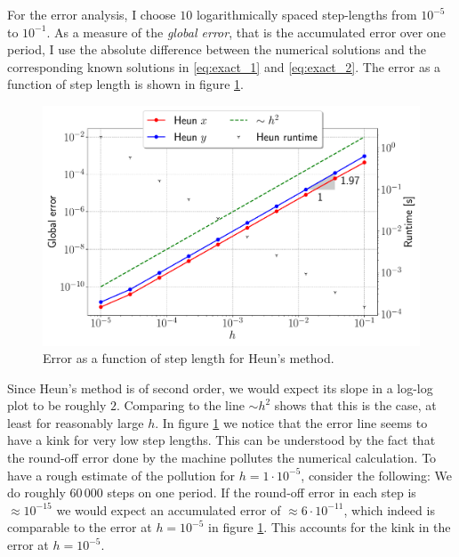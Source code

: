 For the error analysis, I choose $10$ logarithmically spaced step-lengths from $10^{-5}$ to $10^{-1}$. As a measure of the \textit{global error}, that is the accumulated error over one period, I use the absolute difference between the numerical solutions and the corresponding known solutions in \eqref{eq:exact_1} and \eqref{eq:exact_2}. The error as a function of step length is shown in figure \ref{fig:err_heun}.
\begin{figure}[htb]
		\centering
		\includegraphics[width =0.8\columnwidth]{../fig/err_heun.pdf}
		\caption{Error as a function of step length for Heun's method.}
		\label{fig:err_heun}
\end{figure}
Since Heun's method is of second order, we would expect its slope in a log-log plot to be roughly $2$. Comparing to the line $\sim h^2$ shows that this is the case, at least for reasonably large $h$. In figure \ref{fig:err_heun} we notice that the error line seems to have a kink for very low step lengths. This can be understood by the fact that the round-off error done by the machine pollutes the numerical calculation. To have a rough estimate of the pollution for $h = 1\cdot 10^{-5}$, consider the following: We do roughly $60\,000$ steps on one period. If the round-off error in each step is $\approx 10^{-15}$ we would expect an accumulated error of $\approx 6\cdot 10^{-11}$, which indeed is comparable to the error at $h = 10^{-5}$ in figure \ref{fig:err_heun}. This accounts for the kink in the error at $h=10^{-5}$. 

